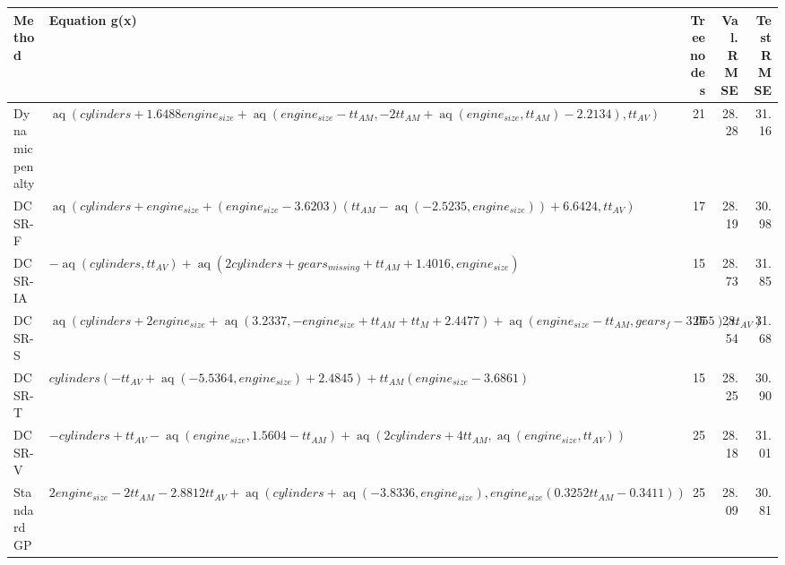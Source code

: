 \begin{tabular}{lp{8cm}rrr}
\toprule
Method & Equation g(x) & Tree nodes & Val. RMSE & Test RMSE \\
\midrule
Dynamic penalty & $\operatorname{aq}{\left(cylinders + 1.6488 engine_{size} + \operatorname{aq}{\left(engine_{size} - tt_{AM},- 2 tt_{AM} + \operatorname{aq}{\left(engine_{size},tt_{AM} \right)} - 2.2134 \right)},tt_{AV} \right)}$ & 21 & 28.28 & 31.16 \\
DCSR-F & $\operatorname{aq}{\left(cylinders + engine_{size} + \left(engine_{size} - 3.6203\right) \left(tt_{AM} - \operatorname{aq}{\left(-2.5235,engine_{size} \right)}\right) + 6.6424,tt_{AV} \right)}$ & 17 & 28.19 & 30.98 \\
DCSR-IA & $- \operatorname{aq}{\left(cylinders,tt_{AV} \right)} + \operatorname{aq}{\left(2 cylinders + gears_{missing} + tt_{AM} + 1.4016,engine_{size} \right)}$ & 15 & 28.73 & 31.85 \\
DCSR-S & $\operatorname{aq}{\left(cylinders + 2 engine_{size} + \operatorname{aq}{\left(3.2337,- engine_{size} + tt_{AM} + tt_{M} + 2.4477 \right)} + \operatorname{aq}{\left(engine_{size} - tt_{AM},gears_{f} - 3.055 \right)},tt_{AV} \right)}$ & 25 & 28.54 & 31.68 \\
DCSR-T & $cylinders \left(- tt_{AV} + \operatorname{aq}{\left(-5.5364,engine_{size} \right)} + 2.4845\right) + tt_{AM} \left(engine_{size} - 3.6861\right)$ & 15 & 28.25 & 30.90 \\
DCSR-V & $- cylinders + tt_{AV} - \operatorname{aq}{\left(engine_{size},1.5604 - tt_{AM} \right)} + \operatorname{aq}{\left(2 cylinders + 4 tt_{AM},\operatorname{aq}{\left(engine_{size},tt_{AV} \right)} \right)}$ & 25 & 28.18 & 31.01 \\
Standard GP & $2 engine_{size} - 2 tt_{AM} - 2.8812 tt_{AV} + \operatorname{aq}{\left(cylinders + \operatorname{aq}{\left(-3.8336,engine_{size} \right)},engine_{size} \left(0.3252 tt_{AM} - 0.3411\right) \right)}$ & 25 & 28.09 & 30.81 \\
\bottomrule
\end{tabular}
